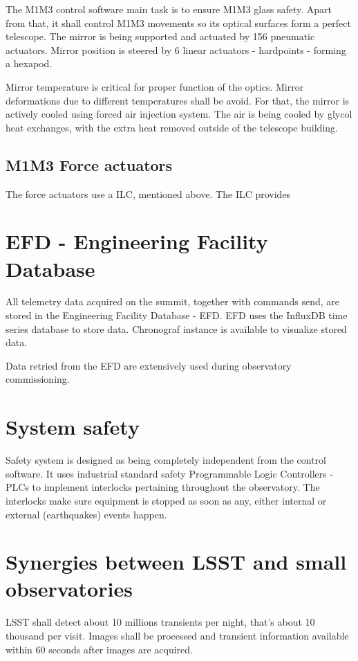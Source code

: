\documentclass[proceedings, preprint]{rmaa}
\begin{document}
The M1M3 control software main task is to ensure M1M3 glass safety. Apart from
that, it shall control M1M3 movements so its optical surfaces form a perfect
telescope. The mirror is being supported and actuated by 156 pneumatic
actuators. Mirror position is steered by 6 linear actuators - hardpoints -
forming a hexapod.

Mirror temperature is critical for proper function of the optics. Mirror
deformations due to different temperatures shall be avoid. For that, the mirror
is actively cooled using forced air injection system. The air is being cooled
by glycol heat exchanges, with the extra heat removed outside of the telescope
building.

\subsection{M1M3 Force actuators}

The force actuators use a ILC, mentioned above. The ILC provides 

\section{EFD - Engineering Facility Database}

All telemetry data acquired on the summit, together with commands send, are
stored in the Engineering Facility Database - EFD. EFD uses the InfluxDB time
series database to store data. Chronograf instance is available to visualize
stored data.

Data retried from the EFD are extensively used during observatory
commissioning.

\section{System safety}

Safety system is designed as being completely independent from the control
software. It uses industrial standard safety Programmable Logic Controllers -
PLCs to implement interlocks pertaining throughout the observatory. The
interlocks make sure equipment is stopped as soon as any, either internal or
external (earthquakes) events happen.

\section{Synergies between LSST and small observatories}

LSST shall detect about 10 millions transients per night, that's about 10
thousand per visit\cite{lsstdata}. Images shall be processed and transient information
available within 60 seconds after images are acquired.
\end{document}
